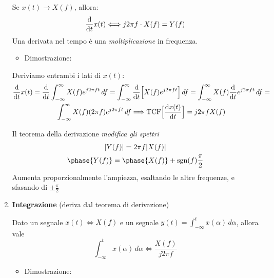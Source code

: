 \documentclass[
]{article}
\providecommand{\tightlist}{%
  \setlength{\itemsep}{0pt}\setlength{\parskip}{0pt}}
\begin{document}
\begin{enumerate}
  Se \(x(t) \to X(f)\), allora: \[
  \odv{}{t} x(t) \Longleftrightarrow j2\pi f \cdot X(f) = Y(f)
  \] Una derivata nel tempo è una \emph{moltiplicazione} in frequenza.

  \begin{itemize}
  \tightlist
  \item
    Dimostrazione:
  \end{itemize}

  Deriviamo entrambi i lati di \(x(t)\): \begin{gather*}
  \odv{}{t}x(t) = \odv{}{t} \int_{-\infty}^{\infty} X(f) e^{j2\pi ft} \,df = \int_{-\infty}^{\infty}\odv{}{t} \Big [X(f) e^{j2\pi ft} \Big ] \,df = \int_{-\infty}^{\infty} X(f) \odv{}{t}e^{j2\pi ft} \,df = 
  \\
  \int_{-\infty}^{\infty} X(f) (2\pi f) e^{j2\pi ft} \,df \Longrightarrow \text{TCF}\Big[\odv{x(t)}{t}\Big] = j2\pi f X(f)
  \end{gather*}

  Il teorema della derivazione \emph{modifica gli spettri}
  \begin{gather*}
  |Y(f)| = 2\pi f |X(f)| \\ \phase{Y(f)} = \phase{X(f)} + \text{sgn}(f)\frac{\pi}{2}
  \end{gather*} Aumenta proporzionalmente l'ampiezza, esaltando le altre
  frequenze, e sfasando di \(\pm \frac{\pi}{2}\)
\item
  \textbf{Integrazione} (deriva dal teorema di derivazione)

  Dato un segnale \(x(t) \Longleftrightarrow X(f)\) e un segnale
  \(y(t) = \int_{-\infty}^{t} x(\alpha) \,d\alpha\), allora vale \[
  \int_{-\infty}^{t}  x(\alpha) \,d\alpha \Longleftrightarrow \frac{X(f)}{j2\pi f}
  \]

  \begin{itemize}
  \tightlist
  \item
    Dimostrazione:
  \end{itemize}


\end{enumerate}
\end{document}
